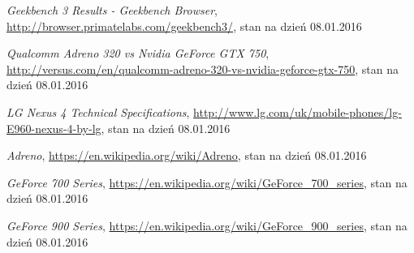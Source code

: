 \begin{thebibliography}{999}
 \emph{Geekbench 3 Results - Geekbench Browser}, \href{http://browser.primatelabs.com/geekbench3/}{http://browser.primatelabs.com/geekbench3/}, stan na dzień 08.01.2016

 \emph{Qualcomm Adreno 320 vs Nvidia GeForce GTX 750}, \href{http://versus.com/en/qualcomm-adreno-320-vs-nvidia-geforce-gtx-750}{http://versus.com/en/qualcomm-adreno-320-vs-nvidia-geforce-gtx-750}, stan na dzień 08.01.2016

 \emph{LG Nexus 4 Technical Specifications}, \href{http://www.lg.com/uk/mobile-phones/lg-E960-nexus-4-by-lg}{http://www.lg.com/uk/mobile-phones/lg-E960-nexus-4-by-lg}, stan na dzień 08.01.2016

 \emph{Adreno}, \href{https://en.wikipedia.org/wiki/Adreno}{https://en.wikipedia.org/wiki/Adreno}, stan na dzień 08.01.2016

 \emph{GeForce 700 Series}, \href{https://en.wikipedia.org/wiki/GeForce_700_series}{https://en.wikipedia.org/wiki/GeForce\_700\_series}, stan na dzień 08.01.2016

 \emph{GeForce 900 Series}, \href{https://en.wikipedia.org/wiki/GeForce_900_series}{https://en.wikipedia.org/wiki/GeForce\_900\_series}, stan na dzień 08.01.2016

\end{thebibliography}
